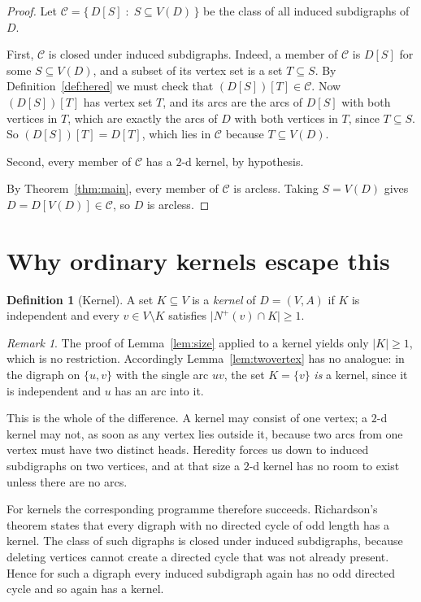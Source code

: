 \documentclass[11pt]{article}
\theoremstyle{plain}
\theoremstyle{definition}
\newtheorem{definition}[theorem]{Definition}
\theoremstyle{remark}
\newtheorem{remark}[theorem]{Remark}
\newcommand{\Nout}{N^{+}}
\begin{document}
\begin{proof}
Let $\mathcal{C} = \{\, D[S] \;:\; S \subseteq V(D) \,\}$ be the class of all induced
subdigraphs of $D$.

First, $\mathcal{C}$ is closed under induced subdigraphs. Indeed, a member of $\mathcal{C}$
is $D[S]$ for some $S \subseteq V(D)$, and a subset of its vertex set is a set $T \subseteq S$.
By Definition~\ref{def:hered} we must check that $(D[S])[T] \in \mathcal{C}$. Now $(D[S])[T]$ has vertex
set $T$, and its arcs are the arcs of $D[S]$ with both vertices in $T$, which are exactly the
arcs of $D$ with both vertices in $T$, since $T \subseteq S$. So $(D[S])[T] = D[T]$, which
lies in $\mathcal{C}$ because $T \subseteq V(D)$.

Second, every member of $\mathcal{C}$ has a $2$-d kernel, by hypothesis.

By Theorem~\ref{thm:main}, every member of $\mathcal{C}$ is arcless. Taking $S = V(D)$ gives
$D = D[V(D)] \in \mathcal{C}$, so $D$ is arcless.
\end{proof}

\section{Why ordinary kernels escape this}

\begin{definition}[Kernel]
A set $K \subseteq V$ is a \emph{kernel} of $D = (V,A)$ if $K$ is independent and every
$v \in V \setminus K$ satisfies $\lvert \Nout(v) \cap K \rvert \geq 1$.
\end{definition}

\begin{remark}\label{rem:contrast}
The proof of Lemma~\ref{lem:size} applied to a kernel yields only $\lvert K \rvert \geq 1$, which
is no restriction. Accordingly Lemma~\ref{lem:twovertex} has no analogue: in the digraph on
$\{u,v\}$ with the single arc $uv$, the set $K = \{v\}$ \emph{is} a kernel, since it is
independent and $u$ has an arc into it.

This is the whole of the difference. A kernel may consist of one vertex; a $2$-d kernel may
not, as soon as any vertex lies outside it, because two arcs from one vertex must have two
distinct heads. Heredity forces us down to induced subdigraphs on two vertices, and at that
size a $2$-d kernel has no room to exist unless there are no arcs.

For kernels the corresponding programme therefore succeeds. Richardson's theorem states that
every digraph with no directed cycle of odd length has a kernel. The class of such digraphs
is closed under induced subdigraphs, because deleting vertices cannot create a directed cycle
that was not already present. Hence for such a digraph every induced subdigraph again has no
odd directed cycle and so again has a kernel.
\end{remark}
\end{document}
